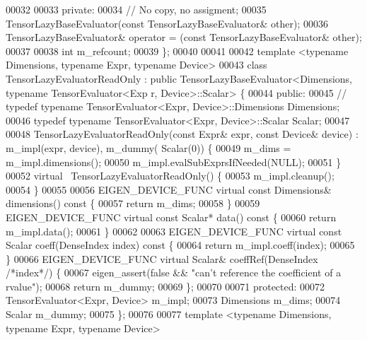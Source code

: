 \begin{DoxyCode}
00032 
00033  \textcolor{keyword}{private}:
00034   \textcolor{comment}{// No copy, no assigment;}
00035   TensorLazyBaseEvaluator(\textcolor{keyword}{const} TensorLazyBaseEvaluator& other);
00036   TensorLazyBaseEvaluator& operator = (\textcolor{keyword}{const} TensorLazyBaseEvaluator& other);
00037 
00038   \textcolor{keywordtype}{int} m\_refcount;
00039 \};
00040 
00041 
00042 \textcolor{keyword}{template} <\textcolor{keyword}{typename} Dimensions, \textcolor{keyword}{typename} Expr, \textcolor{keyword}{typename} Device>
00043 \textcolor{keyword}{class }TensorLazyEvaluatorReadOnly : \textcolor{keyword}{public} TensorLazyBaseEvaluator<Dimensions, typename TensorEvaluator<Exp
      r, Device>::Scalar> \{
00044  \textcolor{keyword}{public}:
00045   \textcolor{comment}{//  typedef typename TensorEvaluator<Expr, Device>::Dimensions Dimensions;}
00046   \textcolor{keyword}{typedef} \textcolor{keyword}{typename} TensorEvaluator<Expr, Device>::Scalar Scalar;
00047 
00048   TensorLazyEvaluatorReadOnly(\textcolor{keyword}{const} Expr& expr, \textcolor{keyword}{const} Device& device) : m\_impl(expr, device), m\_dummy(
      Scalar(0)) \{
00049     m\_dims = m\_impl.dimensions();
00050     m\_impl.evalSubExprsIfNeeded(NULL);
00051   \}
00052   \textcolor{keyword}{virtual} ~TensorLazyEvaluatorReadOnly() \{
00053     m\_impl.cleanup();
00054   \}
00055 
00056   EIGEN\_DEVICE\_FUNC \textcolor{keyword}{virtual} \textcolor{keyword}{const} Dimensions& dimensions()\textcolor{keyword}{ const }\{
00057     \textcolor{keywordflow}{return} m\_dims;
00058   \}
00059   EIGEN\_DEVICE\_FUNC \textcolor{keyword}{virtual} \textcolor{keyword}{const} Scalar* data()\textcolor{keyword}{ const }\{
00060     \textcolor{keywordflow}{return} m\_impl.data();
00061   \}
00062 
00063   EIGEN\_DEVICE\_FUNC \textcolor{keyword}{virtual} \textcolor{keyword}{const} Scalar coeff(DenseIndex index)\textcolor{keyword}{ const }\{
00064     \textcolor{keywordflow}{return} m\_impl.coeff(index);
00065   \}
00066   EIGEN\_DEVICE\_FUNC \textcolor{keyword}{virtual} Scalar& coeffRef(DenseIndex \textcolor{comment}{/*index*/}) \{
00067     eigen\_assert(\textcolor{keyword}{false} && \textcolor{stringliteral}{"can't reference the coefficient of a rvalue"});
00068     \textcolor{keywordflow}{return} m\_dummy;
00069   \};
00070 
00071  \textcolor{keyword}{protected}:
00072   TensorEvaluator<Expr, Device> m\_impl;
00073   Dimensions m\_dims;
00074   Scalar m\_dummy;
00075 \};
00076 
00077 \textcolor{keyword}{template} <\textcolor{keyword}{typename} Dimensions, \textcolor{keyword}{typename} Expr, \textcolor{keyword}{typename} Device>

\end{DoxyCode}
